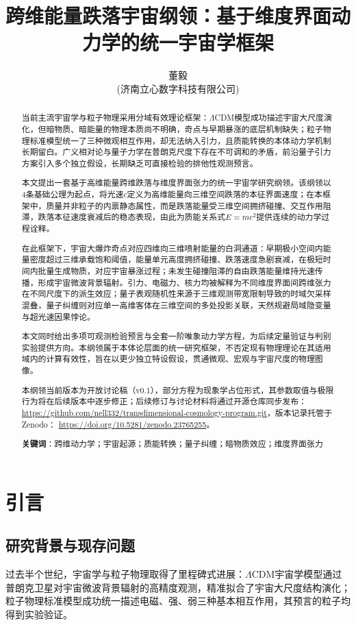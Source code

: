 \documentclass[12pt,a4paper]{ctexart}
\title{跨维能量跌落宇宙纲领：基于维度界面动力学的统一宇宙学框架}
\author{董毅 \\ (济南立心数字科技有限公司)}
\date{}
\begin{document}
\maketitle

\begin{abstract}
当前主流宇宙学与粒子物理采用分域有效理论框架：$\Lambda$CDM模型成功描述宇宙大尺度演化，但暗物质、暗能量的物理本质尚不明确，奇点与早期暴涨的底层机制缺失；粒子物理标准模型统一了三种微观相互作用，却无法纳入引力，且质能转换的本体动力学机制长期留白。广义相对论与量子力学在普朗克尺度下存在不可调和的矛盾，前沿量子引力方案引入多个独立假设，长期缺乏可直接检验的排他性观测预言。

本文提出一套基于高维能量跨维跌落与维度界面张力的统一宇宙学研究纲领。该纲领以4条基础公理为起点，将光速$c$定义为高维能量向三维空间跌落的本征界面速度；在本框架中，质量并非粒子的内禀静态属性，而是跌落能量受三维空间拥挤碰撞、交互作用阻滞，跌落本征速度衰减后的稳态表现，由此为质能关系式$E=mc^2$提供连续的动力学过程诠释。

在此框架下，宇宙大爆炸奇点对应四维向三维喷射能量的白洞通道：早期极小空间内能量密度超过三维承载饱和阈值，能量单元高度拥挤碰撞、跌落速度急剧衰减，在极短时间内批量生成物质，对应宇宙暴涨过程；未发生碰撞阻滞的自由跌落能量维持光速传播，形成宇宙微波背景辐射。引力、电磁力、核力均被解释为不同维度界面间跨维张力在不同尺度下的派生效应；量子表观随机性来源于三维观测带宽限制导致的时域欠采样混叠，量子纠缠则对应单一高维客体在三维空间的多处投影关联，天然规避局域隐变量与超光速因果悖论。

本文同时给出多项可观测检验预言与全套一阶唯象动力学方程，为后续定量验证与判别实验提供方向。本纲领属于本体论层面的统一研究框架，不否定现有物理理论在其适用域内的计算有效性，旨在以更少独立特设假设，贯通微观、宏观与宇宙尺度的物理图像。

本纲领当前版本为开放讨论稿（v0.1），部分方程为现象学占位形式，其参数取值与极限行为将在后续版本中逐步修正；后续修订与讨论材料将通过开源仓库同步发布：
\url{https://github.com/nell332/transdimensional-cosmology-program.git}，版本记录托管于Zenodo：
\url{https://doi.org/10.5281/zenodo.23765255}。

\textbf{关键词}：跨维动力学；宇宙起源；质能转换；量子纠缠；暗物质效应；维度界面张力
\end{abstract}

\section{引言}
\subsection{研究背景与现存问题}
过去半个世纪，宇宙学与粒子物理取得了里程碑式进展：$\Lambda$CDM宇宙学模型通过普朗克卫星对宇宙微波背景辐射的高精度观测，精准拟合了宇宙大尺度结构演化\cite{planck2018}；粒子物理标准模型成功统一描述电磁、强、弱三种基本相互作用，其预言的粒子均得到实验验证\cite{oerter2006}。
\end{document}
